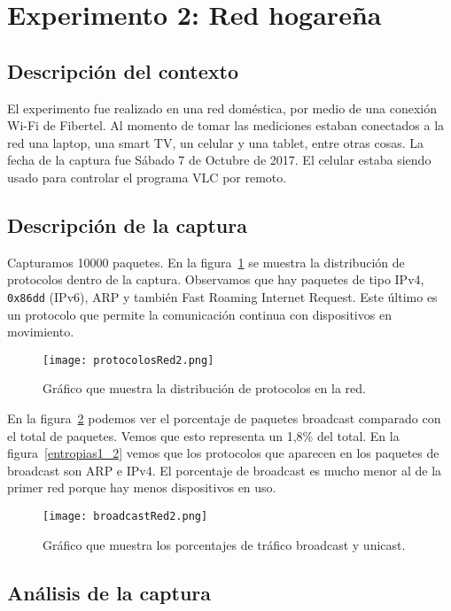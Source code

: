 \section{Experimento 2: Red hogareña}

\subsection{Descripción del contexto}

El experimento fue realizado en una red doméstica, por medio de una conexión Wi-Fi de Fibertel. Al momento de tomar las mediciones estaban conectados a la red una laptop, una smart TV, un celular y una tablet, entre otras cosas. La fecha de la captura fue Sábado 7 de Octubre de 2017. El celular estaba siendo usado para controlar el programa VLC por remoto.

\subsection{Descripción de la captura}

Capturamos 10000 paquetes. En la figura~\ref{protocolos2} se muestra la distribución de protocolos dentro de la captura. Observamos que hay paquetes de tipo IPv4, \texttt{0x86dd} (IPv6), ARP y también Fast Roaming Internet Request. Este último es un protocolo que permite la comunicación continua con dispositivos en movimiento. 

\begin{figure}[H]
\centering
\texttt{[image: protocolosRed2.png]}
\caption{Gráfico que muestra la distribución de protocolos en la red.}
\label{protocolos2}
\end{figure}

En la figura~\ref{broadcast2} podemos ver el porcentaje de paquetes broadcast comparado con el total de paquetes. Vemos que esto representa un 1,8\% del total. En la figura~\ref{entropias1_2} vemos que los protocolos que aparecen en los paquetes de broadcast son ARP e IPv4. El porcentaje de broadcast es mucho menor al de la primer red porque hay menos dispositivos en uso.

\begin{figure}[H]
\centering
\texttt{[image: broadcastRed2.png]}
\caption{Gráfico que muestra los porcentajes de tráfico broadcast y unicast.}
\label{broadcast2}
\end{figure}

\subsection{Análisis de la captura}


